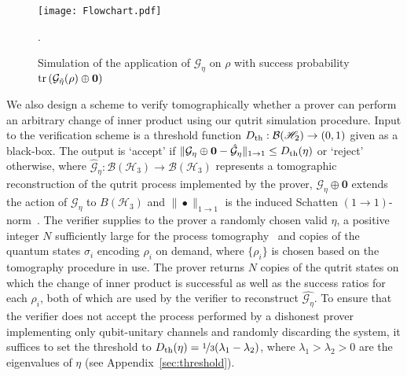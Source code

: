\documentclass[amsmath,amssymb,aps,pra,superscriptaddress,twocolumn]{revtex4-2}
\begin{document}
\begin{figure}
\begin{center}
\texttt{[image: Flowchart.pdf]}
\end{center}
\vspace{-0.5cm}
\caption{Simulation of the application of $\mathcal{G}_{{\eta}}$ on $\rho$ with success probability
${\rm tr}\left(\mathcal{G}_{\tilde{\eta}}(\rho)\oplus \bm{0}\right)$}. 
\label{fig:flowchart}
\end{figure}

We also design a scheme to verify tomographically whether a prover
can perform an arbitrary change of inner product using our qutrit simulation procedure.
Input to the verification scheme is a threshold function $D_{\rm th}:\mathcal{B}(\mathscr{H}_2)\to (0,1)$ given as a black-box.
The output is `accept' if $\|\mathcal{G}_\eta\oplus \bm{0} - \hat{\mathcal{G}}_\eta\|_{1\to 1}\leq D_{\rm th}(\eta)$ 
or `reject' otherwise, where $\hat{\mathcal{G}}_\eta:\mathcal{B}(\mathscr{H}_3)\to \mathcal{B}(\mathscr{H}_3)$ 
represents a tomographic reconstruction of the qutrit process implemented by the prover, 
$\mathcal{G}_\eta\oplus \bm{0}$ extends the action of $\mathcal{G}_\eta$ to $B(\mathscr{H}_3)$
and $\|\bullet\|_{1 \to 1}$ is the induced Schatten $(1\to 1)$-norm~\cite{Pau03}.
The verifier supplies to the prover a randomly chosen valid $\eta$, a positive integer 
$N$ sufficiently large for the process tomography~\cite{STM11}
and copies of the quantum states $\sigma_i$ encoding $\rho_i$ on demand,
where $\{\rho_i\}$ is chosen based on the tomography procedure in use. 
The prover returns $N$ copies of the qutrit states on which the change of inner product is successful
 as well as the success ratios for each $\rho_i$,
both of which are used by the verifier to reconstruct $\hat{\mathcal{G}_\eta}$.
To ensure that the verifier does not accept the process 
performed by a dishonest prover implementing only
qubit-unitary channels and randomly discarding the system,
it suffices to set the threshold to 
$D_{\rm th}(\eta) = \nicefrac{1}{3}(\lambda_1-\lambda_2)$,
where $\lambda_1>\lambda_2>0$ are the eigenvalues of $\eta$ (see Appendix~\ref{sec:threshold}). 
\end{document}
